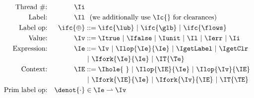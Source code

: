 \begin{figure}[h]
\begin{align*}
\textrm{Thread \#:}   && \Ii          &   \\
\textrm{Label:}       && \Il          & \ \ \text{(we additionally use \Ic{} for clearances)}  \\
\textrm{Label op:}    && \ifc{\oplus} & ::=  \ifc{\lub}
                                        \ |\ \ifc{\glb}
                                        \ |\ \ifc{\flows}\\
\textrm{Value:}       && \Iv          & ::=  \Itrue 
                                        \ |\ \Ifalse
                                        \ |\ \Iunit
                                        \ |\ \Il
                                        \ |\ \Ierr
                                        \ |\ \Ii\\
\textrm{Expression:}  && \Ie          & ::=  \Iv
                                        \ |\ \Ilop{\Ie}{\Ie}
                                        \ |\ \IgetLabel
                                        \ |\ \IgetClr\\&&&
                                        \ |\ \Ifork{\Ie}{\Ie}
                                        \ |\ \IT{\Te}\\
\textrm{Context:}     && \IE          & ::=  \Ihole{\ }
                                        \ |\ \Ilop{\IE}{\Ie}
                                        \ |\ \Ilop{\Iv}{\IE}\\&&&
                                        \ |\ \Ifork{\IE}{\Ie}
                                        \ |\ \Ifork{\Iv}{\IE}
                                        \ |\ \IT{\TE}\\
\textrm{Prim label op:} && \denot{\cdot}   & \in \Ie \rightharpoonup \Iv \\
\end{align*}
\end{figure}
